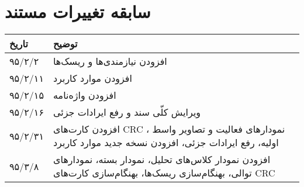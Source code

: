 
\chapter{سابقه تغییرات مستند}

\begin{table}[H]
	\centering
	\begin{tabular}{|p{3cm}|p{5cm}|}
		\hline
		تاریخ & توضیح \\
		\hline
		
		۹۵/۲/۲  & افزودن نیازمندی‌ها و ریسک‌ها \\
		۹۵/۲/۱۱  & افزودن موارد کاربرد \\
		۹۵/۲/۱۵  & افزودن واژه‌نامه \\
		۹۵/۲/۱۶  & ویرایش کلّی سند و رفع ایرادات جزئی \\
		۹۵/۲/۳۱  & افزودن کارت‌های CRC ، نمودارهای فعالیت و تصاویر واسط اولیه، رفع ایرادات جزئی، افزودن نسخه جدید موارد کاربرد \\
		۹۵/۳/۸  & افزودن نمودار کلاس‌های تحلیل، نمودار بسته، نمودارهای توالی، بهنگام‌سازی ریسک‌ها، بهنگام‌سازی کارت‌های CRC \\
		
		\hline
	\end{tabular}
\end{table}
